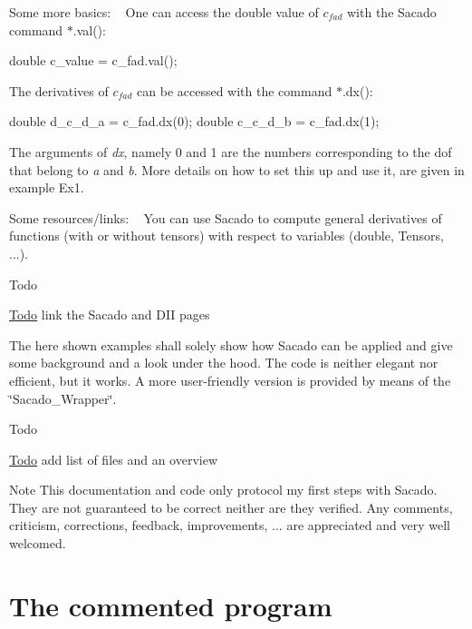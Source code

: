 Some more basics\+: ~\newline
One can access the double value of $ c_{fad} $ with the Sacado command $\ast$.val()\+: 
\begin{DoxyCode}
\textcolor{keywordtype}{double} c\_value = c\_fad.val();
\end{DoxyCode}
 The derivatives of $ c_{fad} $ can be accessed with the command $\ast$.dx()\+: 
\begin{DoxyCode}
\textcolor{keywordtype}{double} d\_c\_d\_a = c\_fad.dx(0);
\textcolor{keywordtype}{double} c\_c\_d\_b = c\_fad.dx(1);
\end{DoxyCode}
 The arguments of {\itshape dx}, namely 0 and 1 are the numbers corresponding to the dof that belong to {\itshape a} and {\itshape b}. More details on how to set this up and use it, are given in example Ex1.

Some resources/links\+: ~\newline
You can use Sacado to compute general derivatives of functions (with or without tensors) with respect to variables (double, Tensors, ...). \begin{DoxyRefDesc}{Todo}
\item[\hyperlink{todo__todo000002}{Todo}]link the Sacado and D\+II pages\end{DoxyRefDesc}


The here shown examples shall solely show how Sacado can be applied and give some background and a look under the hood. The code is neither elegant nor efficient, but it works. A more user-\/friendly version is provided by means of the \char`\"{}\+Sacado\+\_\+\+Wrapper\char`\"{}. ~\newline
\begin{DoxyRefDesc}{Todo}
\item[\hyperlink{todo__todo000003}{Todo}]add list of files and an overview \end{DoxyRefDesc}


\begin{DoxyNote}{Note}
This documentation and code only protocol my first steps with Sacado. They are not guaranteed to be correct neither are they verified. Any comments, criticism, corrections, feedback, improvements, ... are appreciated and very well welcomed.
\end{DoxyNote}
\hypertarget{index_code}{}\section{The commented program}\label{index_code}

